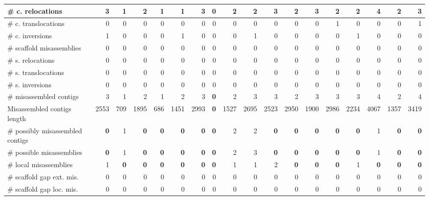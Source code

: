 \documentclass[12pt,a4paper]{article}
\begin{document}
\begin{table}[ht]
\begin{center}
\begin{tabular}{|l*{17}{|r}|}
\hspace{5mm}\# c. relocations & 3 & 1 & 2 & 1 & 1 & 3 & 0 & 2 & 2 & 3 & 2 & 3 & 2 & 2 & 4 & 2 & 3 \\ \hline
\hspace{5mm}\# c. translocations & 0 & 0 & 0 & 0 & 0 & 0 & 0 & 0 & 0 & 0 & 0 & 0 & 1 & 0 & 0 & 0 & 1 \\ \hline
\hspace{5mm}\# c. inversions & 1 & 0 & 0 & 0 & 1 & 0 & 0 & 0 & 1 & 0 & 0 & 0 & 0 & 1 & 0 & 0 & 0 \\ \hline
\hspace{2mm}\# scaffold misassemblies & 0 & 0 & 0 & 0 & 0 & 0 & 0 & 0 & 0 & 0 & 0 & 0 & 0 & 0 & 0 & 0 & 0 \\ \hline
\hspace{5mm}\# s. relocations & 0 & 0 & 0 & 0 & 0 & 0 & 0 & 0 & 0 & 0 & 0 & 0 & 0 & 0 & 0 & 0 & 0 \\ \hline
\hspace{5mm}\# s. translocations & 0 & 0 & 0 & 0 & 0 & 0 & 0 & 0 & 0 & 0 & 0 & 0 & 0 & 0 & 0 & 0 & 0 \\ \hline
\hspace{5mm}\# s. inversions & 0 & 0 & 0 & 0 & 0 & 0 & 0 & 0 & 0 & 0 & 0 & 0 & 0 & 0 & 0 & 0 & 0 \\ \hline
\# misassembled contigs & 3 & 1 & 2 & 1 & 2 & 3 & {\bf 0} & 2 & 3 & 3 & 2 & 3 & 3 & 3 & 4 & 2 & 4 \\ \hline
Misassembled contigs length & 2553 & 709 & 1895 & 686 & 1451 & 2993 & {\bf 0} & 1527 & 2695 & 2523 & 2950 & 1900 & 2986 & 2234 & 4067 & 1357 & 3419 \\ \hline
\# possibly misassembled contigs & {\bf 0} & 1 & {\bf 0} & {\bf 0} & {\bf 0} & {\bf 0} & {\bf 0} & 2 & 2 & {\bf 0} & {\bf 0} & {\bf 0} & {\bf 0} & {\bf 0} & 1 & {\bf 0} & {\bf 0} \\ \hline
\hspace{5mm}\# possible misassemblies & {\bf 0} & 1 & {\bf 0} & {\bf 0} & {\bf 0} & {\bf 0} & {\bf 0} & 2 & 3 & {\bf 0} & {\bf 0} & {\bf 0} & {\bf 0} & {\bf 0} & 1 & {\bf 0} & {\bf 0} \\ \hline
\# local misassemblies & 1 & {\bf 0} & {\bf 0} & {\bf 0} & {\bf 0} & {\bf 0} & {\bf 0} & 1 & 1 & 2 & {\bf 0} & {\bf 0} & {\bf 0} & 1 & {\bf 0} & {\bf 0} & {\bf 0} \\ \hline
\# scaffold gap ext. mis. & 0 & 0 & 0 & 0 & 0 & 0 & 0 & 0 & 0 & 0 & 0 & 0 & 0 & 0 & 0 & 0 & 0 \\ \hline
\# scaffold gap loc. mis. & 0 & 0 & 0 & 0 & 0 & 0 & 0 & 0 & 0 & 0 & 0 & 0 & 0 & 0 & 0 & 0 & 0 \\ \hline

\end{tabular}
\end{center}
\end{table}
\end{document}
